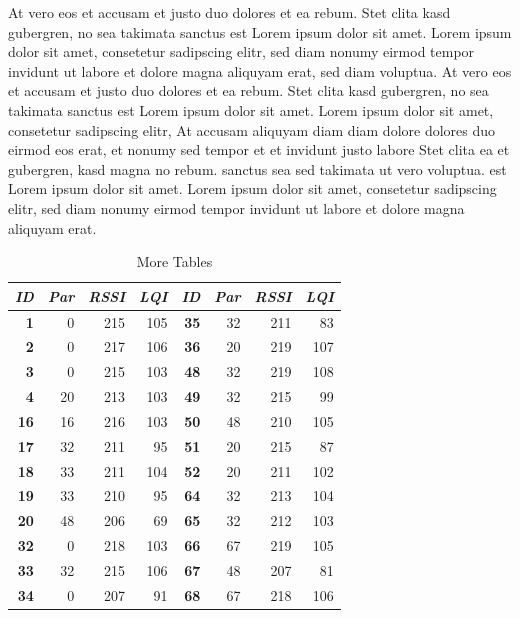 At vero eos et accusam et justo duo dolores et ea rebum. Stet clita kasd
gubergren, no sea takimata sanctus est Lorem ipsum dolor sit amet. Lorem ipsum
dolor sit amet, consetetur sadipscing elitr,  sed diam nonumy eirmod tempor
invidunt ut labore et dolore magna aliquyam erat, sed diam voluptua. At vero
eos et accusam et justo duo dolores et ea rebum. Stet clita kasd gubergren, no
sea takimata sanctus est Lorem ipsum dolor sit amet. Lorem ipsum dolor sit
amet, consetetur sadipscing elitr,  At accusam aliquyam diam diam dolore
dolores duo eirmod eos erat, et nonumy sed tempor et et invidunt justo labore
Stet clita ea et gubergren, kasd magna no rebum. sanctus sea sed takimata ut
vero voluptua. est Lorem ipsum dolor sit amet. Lorem ipsum dolor sit amet,
consetetur sadipscing elitr,  sed diam nonumy eirmod tempor invidunt ut labore
et dolore magna aliquyam erat. 

\begin{table}
\begin{center}
\begin{tabular}{|r|r|r|r||r|r|r|r|}
\hline \textbf{\textit{ID}} & \textbf{\textit{Par}} & \textbf{\textit{RSSI}} &
\textbf{\textit{LQI}} &
\textbf{\textit{ID}} & \textbf{\textit{Par}} & \textbf{\textit{RSSI}} & \textbf{\textit{LQI}} \\
\hline \hline
\textbf{1}  &  0 & 215 & 105 & \textbf{35} & 32 & 211 &  83 \\
\textbf{2}  &  0 & 217 & 106 & \textbf{36} & 20 & 219 & 107 \\
\textbf{3}  &  0 & 215 & 103 & \textbf{48} & 32 & 219 & 108 \\
\textbf{4}  & 20 & 213 & 103 & \textbf{49} & 32 & 215 &  99 \\
\textbf{16} & 16 & 216 & 103 & \textbf{50} & 48 & 210 & 105 \\
\textbf{17} & 32 & 211 &  95 & \textbf{51} & 20 & 215 &  87 \\
\textbf{18} & 33 & 211 & 104 & \textbf{52} & 20 & 211 & 102 \\
\textbf{19} & 33 & 210 &  95 & \textbf{64} & 32 & 213 & 104 \\
\textbf{20} & 48 & 206 &  69 & \textbf{65} & 32 & 212 & 103 \\
\textbf{32} &  0 & 218 & 103 & \textbf{66} & 67 & 219 & 105 \\
\textbf{33} & 32 & 215 & 106 & \textbf{67} & 48 & 207 &  81 \\
\textbf{34} &  0 & 207 &  91 & \textbf{68} & 67 & 218 & 106 \\
\hline
\end{tabular}
\caption{More Tables}
\end{center}
\end{table}

